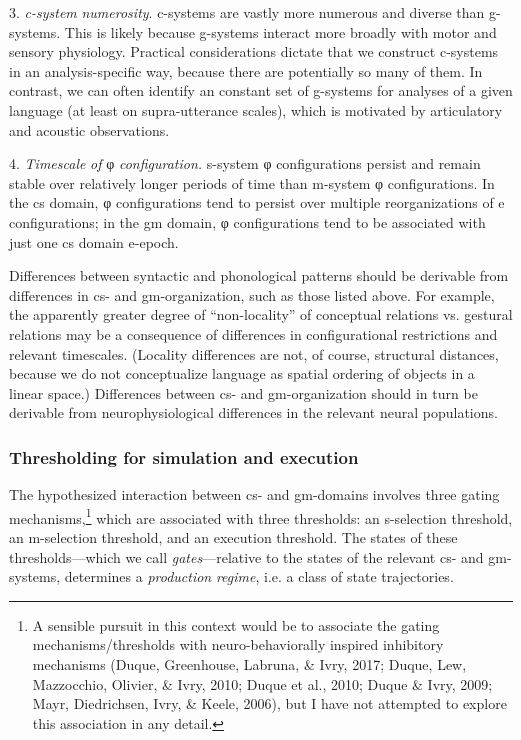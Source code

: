 3. \textit{c-system} \textit{numerosity}. c-systems are vastly more numerous and diverse than g-systems. This is likely because g-systems interact more broadly with motor and sensory physiology. Practical considerations dictate that we construct c-systems in an analysis-specific way, because there are potentially so many of them. In contrast, we can often identify an constant set of g-systems for analyses of a given language (at least on supra-utterance scales), which is motivated  by articulatory and acoustic observations.

4. \textit{Timescale} \textit{of} φ \textit{configuration.} s-system φ configurations persist and remain stable over relatively longer periods of time than m-system φ configurations. In the cs domain, φ configurations tend to persist over multiple reorganizations of e configurations; in the gm domain, φ configurations tend to be associated with just one cs domain e-epoch.

  Differences between syntactic and phonological patterns should be derivable from differences in cs- and gm-organization, such as those listed above. For example, the apparently greater degree of “non-locality” of conceptual relations vs. gestural relations may be a consequence of differences in configurational restrictions and relevant timescales. (Locality differences are not, of course, structural distances, because we do not conceptualize language as spatial ordering of objects in a linear space.) Differences between cs- and gm-organization should in turn be derivable from neurophysiological differences in the relevant neural populations.

\subsubsection{Thresholding for simulation and execution}

The hypothesized interaction between cs- and gm-domains involves three gating mechanisms,\footnote{A sensible pursuit in this context would be to associate the gating mechanisms/thresholds with neuro-behaviorally inspired inhibitory mechanisms (Duque, Greenhouse, Labruna, \& Ivry, 2017; Duque, Lew, Mazzocchio, Olivier, \& Ivry, 2010; Duque et al., 2010; Duque \& Ivry, 2009; Mayr, Diedrichsen, Ivry, \& Keele, 2006), but I have not attempted to explore this association in any detail.} which are associated with three thresholds: an s-selection threshold, an m-selection threshold, and an execution threshold. The states of these thresholds—which we call \textit{gates}—relative to the states of the relevant cs- and gm-systems, determines a \textit{production} \textit{regime}, i.e. a class of state trajectories. 

